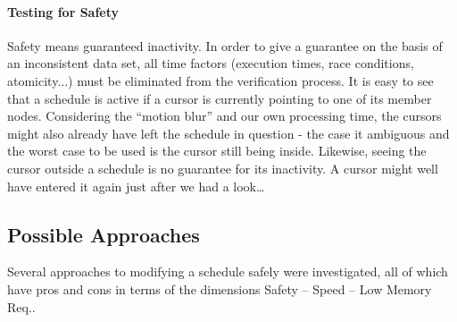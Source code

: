 \paragraph{Testing for Safety}
Safety means guaranteed inactivity. In order to give a guarantee on the basis of an inconsistent data set, all time factors (execution times, race conditions, atomicity...) must be eliminated from the verification process.
It is easy to see that a schedule is active if a cursor is currently pointing to one of its member nodes.
Considering the \enquote{motion blur} and our own processing time, the cursors might also already have left the schedule in question - the case it ambiguous and the worst case to be used is the cursor still being inside.
Likewise, seeing the cursor outside a schedule is no guarantee for its inactivity. A cursor might well have entered it again just after we had a look\dots

\subsection{Possible Approaches}
Several approaches to modifying a schedule safely were investigated, all of which have pros and cons in terms of the dimensions Safety -- Speed -- Low Memory Req..



